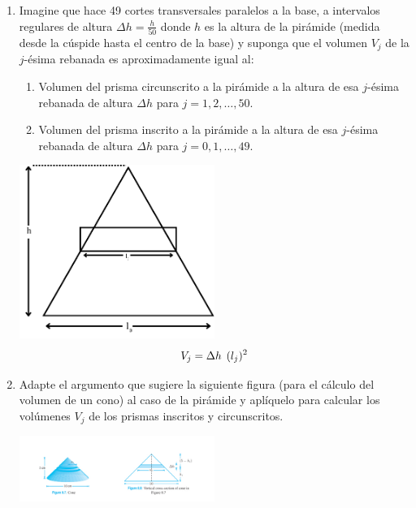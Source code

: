 \documentclass[12pt]{article}
\begin{document}
\begin{enumerate}
    \item Imagine que hace 49 cortes transversales paralelos a la base, a intervalos regulares de altura $\Delta h = \frac{h}{50}$ donde $h$ es la altura de la pirámide (medida desde la cúspide hasta el centro de la base) y suponga que el volumen $V_j$ de la $j$-ésima rebanada es aproximadamente igual al:
    \begin{enumerate}
        \item Volumen del prisma circunscrito a la pirámide a la altura de esa $j$-ésima rebanada de altura $\Delta h$ para $j = 1, 2, \dots, 50$.
        \item Volumen del prisma inscrito a la pirámide a la altura de esa $j$-ésima rebanada de altura $\Delta h$ para $j = 0, 1, \dots, 49$.
    \end{enumerate}
    \includegraphics[width=0.5\textwidth, center]{piramide1.png}
    \[V_j = \Delta h \hspace{4.4pt}(l_j)^2\]

    \item Adapte el argumento que sugiere la siguiente figura (para el cálculo del volumen de un cono) al caso de la pirámide y aplíquelo para calcular los volúmenes $V_j$ de los prismas inscritos y circunscritos. 
 
    \includegraphics[width=0.5\textwidth, center]{cono.png} \\


\end{enumerate}
\end{document}

